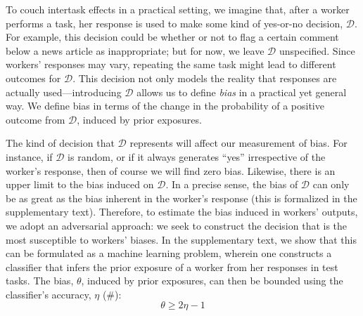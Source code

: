 \documentclass[12pt]{article}
\begin{document}
To couch intertask effects in a practical setting, we imagine
that, after a worker performs a task, her response is used to make some 
kind of yes-or-no decision, $\mathcal{D}$.  For example, this decision 
could be whether or not to flag a certain comment
below a news article as inappropriate; but for now, we leave 
$\mathcal{D}$ unspecified.  Since workers' responses may
vary, repeating the same task might lead to different outcomes for 
$\mathcal{D}$.  This decision not only models the reality that responses are
actually used---introducing $\mathcal{D}$ allows us to define \textit{bias}
in a practical yet general way. We define bias in terms of the
change in the probability of a positive outcome from $\mathcal{D}$, induced 
by prior exposures.

The kind of decision that $\mathcal{D}$ represents will affect our 
measurement of bias.  For instance, if $\mathcal{D}$ is random, or if 
it always generates ``yes'' 
irrespective of the worker's response, then of course we will 
find zero bias.  Likewise, there is an upper limit to the bias induced on $\mathcal{D}$. In a precise sense, the bias of $\mathcal{D}$ can only be as
great as the bias inherent in the worker's response 
(this is formalized in the supplementary text).  Therefore, to estimate the 
bias induced in workers' outputs, we adopt an 
adversarial approach: we seek to construct the decision that 
is the most susceptible to workers' biases. In the supplementary text, we 
show that this can be formulated as a  machine learning problem, wherein one
constructs a classifier that infers the prior exposure of a worker from her 
responses in test tasks.  The bias, $\theta$, induced by 
prior exposures, can then be bounded using the classifier's accuracy, 
$\eta$ (\#):
\begin{equation}
	\theta \geq 2\eta - 1
	\label{l1}
\end{equation}
\end{document}
